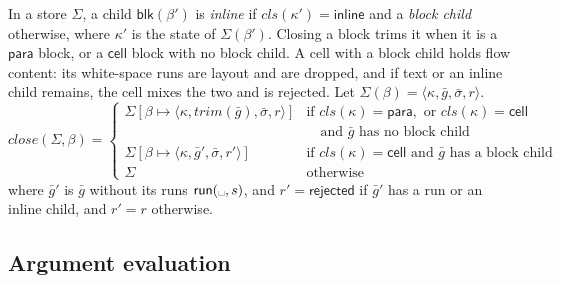 \documentclass[11pt]{article}
\numberwithin{equation}{section}
\newcommand{\kw}[1]{\ensuremath{\mathsf{#1}}}
\newcommand{\vs}{\text{\textvisiblespace}}
\begin{document}
In a store $\Sigma$, a child $\kw{blk}(\beta')$ is \emph{inline} if
$\mathit{cls}(\kappa') = \kw{inline}$ and a \emph{block child} otherwise,
where $\kappa'$ is the state of $\Sigma(\beta')$.  Closing a block trims
it when it is a $\kw{para}$ block, or a $\kw{cell}$ block with no block
child.  A cell with a block child holds flow content: its white-space runs
are layout and are dropped, and if text or an inline child remains, the
cell mixes the two and is rejected.  Let
$\Sigma(\beta) = \langle \kappa, \bar g, \bar\sigma, r\rangle$.
\begin{equation}\label{eq:close}
\mathit{close}(\Sigma, \beta) =
\begin{cases}
\Sigma[\beta \mapsto \langle \kappa, \mathit{trim}(\bar g), \bar\sigma, r\rangle]
  & \text{if } \mathit{cls}(\kappa) = \kw{para}, \text{ or }
    \mathit{cls}(\kappa) = \kw{cell} \\
  & \quad\text{and } \bar g \text{ has no block child} \\
\Sigma[\beta \mapsto \langle \kappa, \bar g', \bar\sigma, r'\rangle]
  & \text{if } \mathit{cls}(\kappa) = \kw{cell}
    \text{ and } \bar g \text{ has a block child} \\
\Sigma & \text{otherwise}
\end{cases}
\end{equation}
where $\bar g'$ is $\bar g$ without its runs $\kw{run}(\vs, s)$, and
$r' = \kw{rejected}$ if $\bar g'$ has a run or an inline child, and
$r' = r$ otherwise.

\subsection{Argument evaluation}
\end{document}
